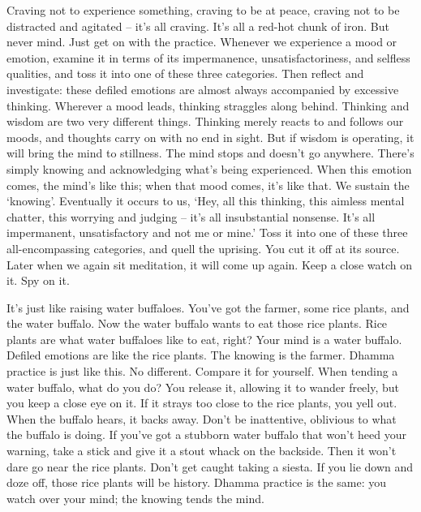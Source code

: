 Craving not to experience something, craving to be at peace, craving not to be distracted and agitated -- it's all craving. It's all a red-hot chunk of iron. But never mind. Just get on with the practice. Whenever we experience a mood or emotion, examine it in terms of its impermanence, unsatisfactoriness, and selfless qualities, and toss it into one of these three categories. Then reflect and investigate: these defiled emotions are almost always accompanied by excessive thinking. Wherever a mood leads, thinking straggles along behind. Thinking and wisdom are two very different things. Thinking merely reacts to and follows our moods, and thoughts carry on with no end in sight. But if wisdom is operating, it will bring the mind to stillness. The mind stops and doesn't go anywhere. There's simply knowing and acknowledging what's being experienced. When this emotion comes, the mind's like this; when that mood comes, it's like that. We sustain the `knowing'. Eventually it occurs to us, `Hey, all this thinking, this aimless mental chatter, this worrying and judging -- it's all insubstantial nonsense. It's all impermanent, unsatisfactory and not me or mine.' Toss it into one of these three all-encompassing categories, and quell the uprising. You cut it off at its source. Later when we again sit meditation, it will come up again. Keep a close watch on it. Spy on it.

It's just like raising water buffaloes. You've got the farmer, some rice plants, and the water buffalo. Now the water buffalo wants to eat those rice plants. Rice plants are what water buffaloes like to eat, right? Your mind is a water buffalo. Defiled emotions are like the rice plants. The knowing is the farmer. Dhamma practice is just like this. No different. Compare it for yourself. When tending a water buffalo, what do you do? You release it, allowing it to wander freely, but you keep a close eye on it. If it strays too close to the rice plants, you yell out. When the buffalo hears, it backs away. Don't be inattentive, oblivious to what the buffalo is doing. If you've got a stubborn water buffalo that won't heed your warning, take a stick and give it a stout whack on the backside. Then it won't dare go near the rice plants. Don't get caught taking a siesta. If you lie down and doze off, those rice plants will be history. Dhamma practice is the same: you watch over your mind; the knowing tends the mind.

